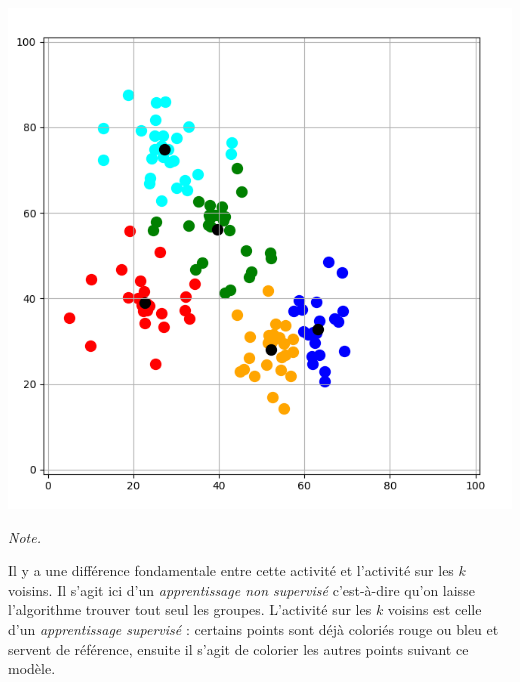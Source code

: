 \documentclass[10pt,class=report,crop=false]{standalone}
\begin{document}
\begin{activite}[Barycentres]
\begin{center}
	\includegraphics[scale=\myscale,scale=0.22]{ecran_barycentres_exemple_bis_05}
\end{center}

\bigskip



\emph{Note.} 

Il y a une différence fondamentale entre cette activité et l'activité sur les  $k$ voisins. Il s'agit ici d'un \emph{apprentissage non supervisé} c'est-à-dire qu'on laisse l'algorithme trouver tout seul les groupes. L'activité sur les $k$ voisins est celle d'un \emph{apprentissage supervisé} : certains points sont déjà coloriés rouge ou bleu et servent de référence, ensuite il s'agit de colorier les autres points suivant ce modèle.


\end{activite}


\bigskip


%
%
%	
%
%
%
\end{document}
